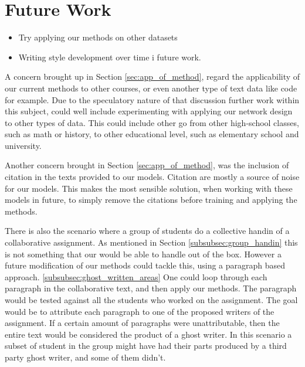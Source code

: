 \section{Future Work} \label{sec:future_work}


\begin{itemize}

    \item Try applying our methods on other datasets
    \item Writing style development over time i future work.

\end{itemize}

A concern brought up in Section \ref{sec:app_of_method}, regard the
applicability of our current methods to other courses, or even another type
of text data like code for example. Due to the speculatory nature of that
discussion further work within this subject, could well include experimenting
with applying our network design to other types of data. This could include
other go from other high-school classes, such as math or history, to other
educational level, such as elementary school and university.

Another concern brought in Section \ref{sec:app_of_method}, was the inclusion of
citation in the texts provided to our models. Citation are mostly a source of
noise for our models. This makes the most sensible solution, when working with
these models in future, to simply remove the citations before training and
applying the methods. 

There is also the scenario where a group of students do a collective handin of a
collaborative assignment. As mentioned in Section \ref{subsubsec:group_handin}
this is not something that our would be able to handle out of the box. However
a future modification of our methods could tackle this, using a paragraph based
approach. \ref{subsubsec:ghost_written_areas} One could loop through each
paragraph in the collaborative text, and then apply our methods. The paragraph
would be tested against all the students who worked on the assignment. The goal
would be to attribute each paragraph to one of the proposed writers of the
assignment. If a certain amount of paragraphs were unattributable, then the
entire text would be considered the product of a ghost writer. 
In this scenario a subset of student in the group might have had their parts
produced by a third party ghost writer, and some of them didn't.

